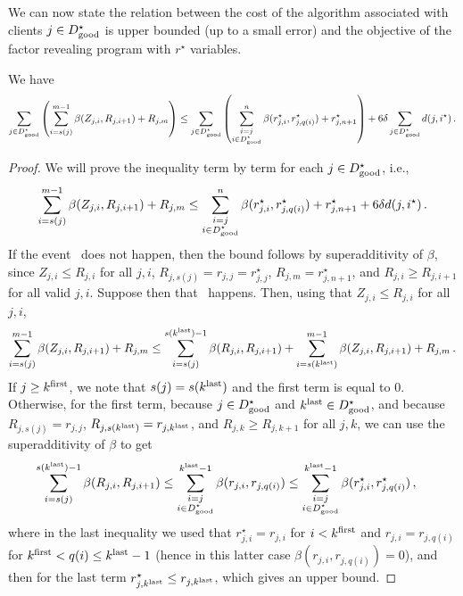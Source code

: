 We can now state the relation between the cost of the algorithm associated with clients $j \in D^\star_{\mathrm{good}}$ is upper bounded (up to a small error) and the objective of the factor revealing program with $r^\star$ variables.

\begin{lemma}
\label{lem:r-star-upper-bound}
We have 
\[\sum_{j \in D^\star_{\mathrm{good}}} \left(\sum_{i=s(j)}^{m-1} \beta(Z_{j,i}, R_{j,i+1}) + R_{j, m}\right) \leq \sum_{j \in D^\star_{\mathrm{good}}} \left(\sum_{\substack{i=j\\i \in D^\star_{\mathrm{good}}}}^n \beta(r^\star_{j,i}, r^\star_{j,q(i)}) + r^\star_{j,n+1}\right) + 6 \delta \sum_{j \in D^\star_{\mathrm{good}}} d(j, i^\star)\,.\]
\end{lemma}
\begin{proof}
We will prove the inequality term by term for each $j \in D^\star_{\mathrm{good}}$, i.e., 
\[\sum_{i=s(j)}^{m-1} \beta(Z_{j,i}, R_{j,i+1}) + R_{j, m} \leq \sum_{\substack{i=j\\i \in D^\star_{\mathrm{good}}}}^n \beta(r^\star_{j,i}, r^\star_{j,q(i)}) + r^\star_{j,n+1} + 6 \delta d(j, i^\star)\,.\]
If the event \specialevent\ does not happen, then the bound follows by superadditivity of $\beta$, since $Z_{j,i} \leq R_{j,i}$ for all $j,i$, $R_{j,s(j)} = r_{j,j} = r^\star_{j,j}$, $R_{j,m} = r^\star_{j,n+1}$, and $R_{j, i} \geq R_{j,i+1}$ for all valid $j, i$.
Suppose then that \specialevent\ happens.
Then, using that $Z_{j,i} \leq R_{j,i}$ for all $j, i$,
\[\sum_{i=s(j)}^{m-1} \beta(Z_{j,i}, R_{j,i+1}) + R_{j, m}
\leq \sum_{i=s(j)}^{s(k^{\mathrm{last}}) - 1} \beta(R_{j,i}, R_{j,i+1}) + \sum_{i=s(k^{\mathrm{last}})}^{m-1} \beta(Z_{j,i}, R_{j,i+1}) + R_{j,m}\,.\]
If $j \geq k^{\mathrm{first}}$, we note that $s(j) = s(k^{\mathrm{last}})$ and the first term is equal to $0$.
Otherwise, for the first term, because $j \in D^\star_{\mathrm{good}}$ and $k^{\mathrm{last}} \in D^\star_{\mathrm{good}}$, and because $R_{j,s(j)} = r_{j,j}$, $R_{j,s(k^{\mathrm{last}})} = r_{j,k^{\mathrm{last}}}$, and $R_{j,k} \geq R_{j,k+1}$ for all $j,k$, we can use the superadditivity of $\beta$ to get
\begin{align*}
\sum_{i=s(j)}^{s(k^{\mathrm{last}}) - 1} \beta(R_{j,i}, R_{j,i+1})
&\leq \sum_{\substack{i=j\\i \in D^\star_{\mathrm{good}}}}^{k^{\mathrm{last}} - 1} \beta(r_{j,i}, r_{j,q(i)})
\leq \sum_{\substack{i=j\\i \in D^\star_{\mathrm{good}}}}^{k^{\mathrm{last}} - 1} \beta(r^\star_{j,i}, r^\star_{j,q(i)})\,,
\end{align*}
where in the last inequality we used that $r^\star_{j,i} = r_{j,i}$ for $i < k^{\mathrm{first}}$ and $r_{j,i} = r_{j,q(i)}$ for $k^{\mathrm{first}} < q(i) \leq k^{\mathrm{last}} - 1$ (hence in this latter case $\beta(r_{j,i}, r_{j,q(i)}) =0$), and then for the last term $r^\star_{j,k^{\mathrm{last}}} \leq r_{j,k^{\mathrm{last}}}$, which gives an upper bound.

\end{proof}
